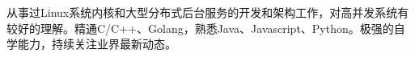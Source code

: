 

\begin{cvparagraph}

从事过Linux系统内核和大型分布式后台服务的开发和架构工作，对高并发系统有较好的理解。精通C/C++、Golang，熟悉Java、Javascript、Python。极强的自学能力，持续关注业界最新动态。
\end{cvparagraph}
